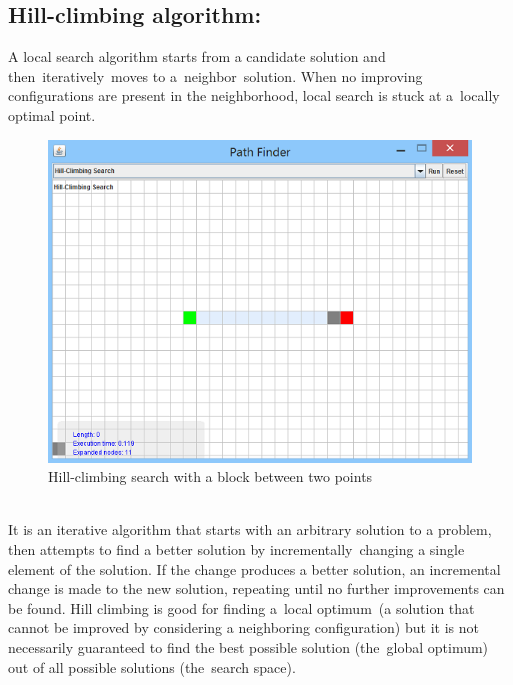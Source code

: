 \documentclass[a4paper]{article}
\begin{document}
\subsection{Hill-climbing algorithm:}

A local search algorithm starts from a candidate solution and then iteratively moves to a neighbor solution. When no improving configurations are present in the neighborhood, local search is stuck at a locally optimal point. \\

\begin{figure}[h!]
  \centering
    \includegraphics[scale=.9]{images/hillclimb1.png}
  \caption{Hill-climbing search with a block between two points}
\end{figure}

\noindent \\
It is an iterative algorithm that starts with an arbitrary solution to a problem, then attempts to find a better solution by incrementally changing a single element of the solution. If the change produces a better solution, an incremental change is made to the new solution, repeating until no further improvements can be found. Hill climbing is good for finding a local optimum (a solution that cannot be improved by considering a neighboring configuration) but it is not necessarily guaranteed to find the best possible solution (the global optimum) out of all possible solutions (the search space).

\end{document}
